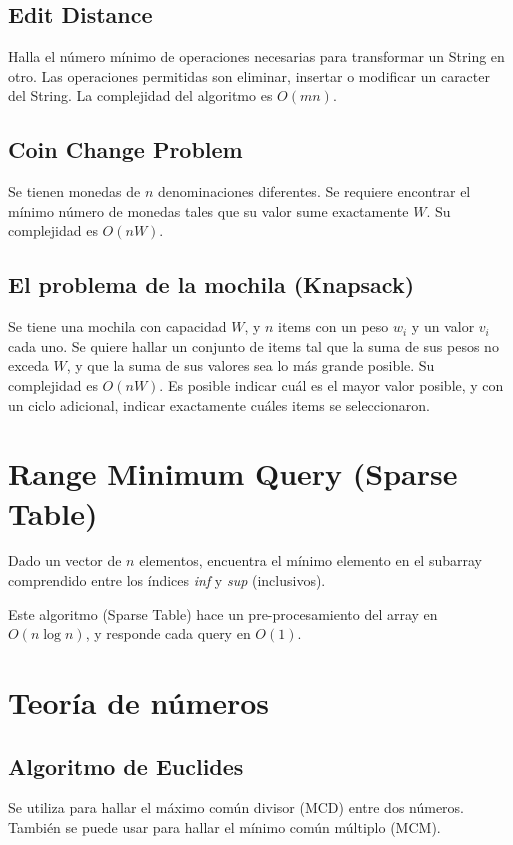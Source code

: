 \documentclass{article}
\begin{document}
\begin{multicols}{2}
	\subsection{Edit Distance}
	Halla el número mínimo de operaciones necesarias para transformar un String en otro. Las operaciones permitidas son eliminar, insertar o modificar un caracter del String. La complejidad del algoritmo es \( O(mn) \).
	
	
	\subsection{Coin Change Problem}
	Se tienen monedas de \( n \) denominaciones diferentes. Se requiere encontrar el mínimo número de monedas tales que su valor sume exactamente \( W \). Su complejidad es \( O(nW) \).
		
	
	\subsection{El problema de la mochila (Knapsack)}
	Se tiene una mochila con capacidad \( W \), y \( n \) items con un peso \( w_i \) y un valor \( v_i \) cada uno. Se quiere hallar un conjunto de items tal que la suma de sus pesos no exceda \( W \), y que la suma de sus valores sea lo más grande posible. Su complejidad es \( O(nW) \). Es posible indicar cuál es el mayor valor posible, y con un ciclo adicional, indicar exactamente cuáles items se seleccionaron.
	
	
\section{Range Minimum Query (Sparse Table)}
Dado un vector de \( n \) elementos, encuentra el mínimo elemento en el subarray comprendido entre los índices \emph{inf} y \emph{sup} (inclusivos).

Este algoritmo (Sparse Table) hace un pre-procesamiento del array en \( O(n \log n) \), y responde cada query en \( O(1) \).
	

\section{Teoría de números}
	\subsection{Algoritmo de Euclides}
	Se utiliza para hallar el máximo común divisor (MCD) entre dos números. También se puede usar para hallar el mínimo común múltiplo (MCM).
	


\end{multicols}
\end{document}
